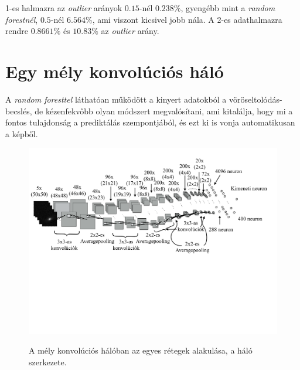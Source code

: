 \documentclass[12pt,letterpaper,oneside,openright]{book}
\begin{document}
1-es halmazra az \textit{outlier} arányok $0.15$-nél $0.238\%$, gyengébb mint a \textit{random forestnél}, $0.5$-nél $6.564\%$, ami viszont kicsivel jobb nála. A 2-es adathalmazra rendre $0.8661\%$ és $10.83\%$ az \textit{outlier} arány.
 
 \section{Egy mély konvolúciós háló}
 A \textit{random foresttel} láthatóan működött a kinyert adatokból a vöröseltolódás-becslés, de kézenfekvőbb olyan módszert megvalósítani, ami kitalálja, hogy mi a fontos tulajdonság a prediktálás szempontjából, és ezt ki is vonja automatikusan a képből.  
  \begin{figure}[h!]
\centering
\includegraphics[width = 1\textwidth, height = 0.5\textwidth]{Figures/cnnf2.pdf}
\label{arch}
\caption{A mély konvolúciós hálóban az egyes rétegek alakulása, a háló szerkezete.}
\end{figure}
\end{document}
